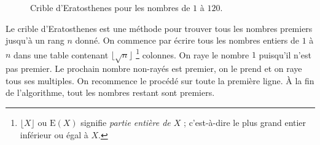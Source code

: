 \begin{figure}[h!]
                  \caption{Crible d'Eratosthenes pour les nombres de $1$ \`a $120$.
                              }
                  \label{fig: Eratosthenes}
                  \end{figure}
            Le crible d'Eratosthenes est une m\'ethode pour trouver tous les nombres premiers jusqu'\`a un rang $n$ donn\'e.
            On commence par \'ecrire tous les nombres entiers de $1$ \`a $n$ dans une table 
            contenant $\lfloor \sqrt{n} \rfloor$%
            \footnote{ $\lfloor X \rfloor$ ou $\mathrm{E}\left( X \right)$ signifie 
                       \emph{partie enti\`ere de $X$} ;
                       c'est-\`a-dire le plus grand entier inf\'erieur ou \'egal \`a $X$.
                     }
            colonnes.
            On raye le nombre $1$ puisqu'il n'est pas premier.
            Le prochain nombre non-ray\'es est premier, on le prend et on raye tous ses multiples.
            On recommence le proc\'ed\'e sur toute la premi\`ere ligne.
            \`A la fin de l'algorithme, tout les nombres restant sont premiers.
%                  
